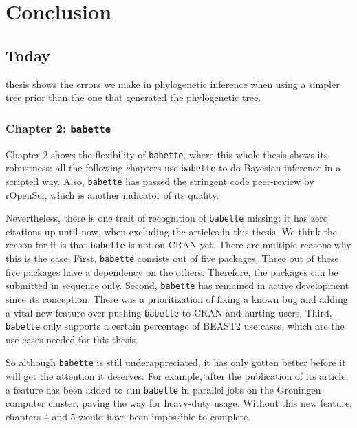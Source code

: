 \chapter{Conclusion}
\label{conclusion}

\newpage

\section{Today}

\noindent 
{} thesis shows the errors we make in phylogenetic inference
when using a simpler tree prior than the one that generated the phylogenetic
tree.

\subsection{Chapter 2: \texttt{babette}}

Chapter 2 shows the flexibility of \verb;babette;, where this whole thesis
shows its robustness: all the following chapters use \verb;babette; to
do Bayesian inference in a scripted way. Also, \verb;babette; has passed
the stringent code peer-review by rOpenSci, which is another indicator of 
its quality.

Nevertheless, there is one trait of recognition of \verb;babette; missing:
it has zero citations up until now, when excluding the articles in this 
thesis. We think the reason for it is that \verb;babette; is
not on CRAN yet. There are multiple reasons why this is the case:
First, \verb;babette; consists out of five packages. Three out of these
five packages have a dependency on the others. Therefore, the packages can
be submitted in sequence only. Second, \verb;babette; has remained in active 
development since its conception. There was a prioritization of 
fixing a known bug and adding a vital new feature over 
pushing \verb;babette; to CRAN and hurting users. Third, \verb;babette;
only supports a certain percentage of BEAST2 use cases, which are the
use cases needed for this thesis. 

So although \verb;babette; is still underappreciated, it has only gotten
better before it will get the attention it deserves. 
For example, after the publication of its article, 
a feature has been added to run \verb;babette; in parallel
jobs on the Groningen computer cluster, paving the way for heavy-duty 
usage. Without this new feature, chapters 4 and 5 would have been
impossible to complete.

